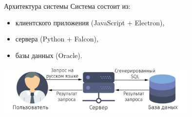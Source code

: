 \begin{frame}[fragile]{Архитектура системы}%
  Система состоит из:
  \begin{itemize}%
    \item клиентского приложения (JavaScript + Electron),
    \item сервера (Python + Falcon),
    \item базы данных (Oracle).
  \end{itemize}
  \begin{center}%
    \includegraphics[width=0.75\textwidth]{img/Arch.png}
  \end{center}
\end{frame}
